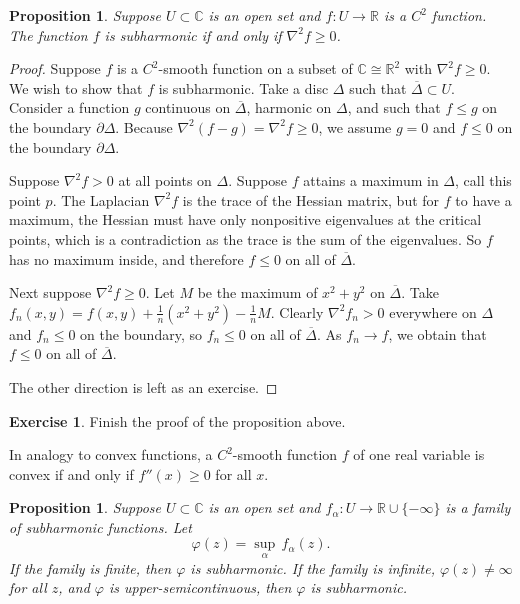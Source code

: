 \documentclass[12pt,openany]{book}
\newcommand{\C}{{\mathbb{C}}}
\newcommand{\R}{{\mathbb{R}}}
\theoremstyle{plain}
\newtheorem{prop}[thm]{Proposition}
\theoremstyle{remark}
\theoremstyle{definition}
\newenvironment{exbox}{%
    \def\FrameCommand{\vrule width 1pt \relax\hspace{10pt}}%
    \MakeFramed {\advance \hsize -\width \FrameRestore}%
}{%
    \endMakeFramed
}
\theoremstyle{exercise}
\newtheorem{exercise}{Exercise}[section]
\theoremstyle{example}
\begin{document}
\begin{prop}
Suppose $U \subset \C$ is an open set and $f \colon U \to \R$ is a $C^2$ function.
The function $f$ is subharmonic if and only if
$\nabla^2 f \geq 0$.
\end{prop}

\begin{proof}
Suppose $f$ is a $C^2$-smooth function on a subset of $\C \cong \R^2$
with $\nabla^2 f \geq 0$.  We wish to show that $f$ is subharmonic.
Take a disc $\Delta$ such that $\overline{\Delta} \subset U$.
Consider a function
$g$ continuous on $\overline{\Delta}$,
harmonic on $\Delta$, and such that
$f \leq g$ on the boundary $\partial \Delta$.  Because
$\nabla^2 (f-g) = \nabla^2 f \geq 0$, we assume $g = 0$ and $f \leq 0$
on the boundary $\partial \Delta$. 

Suppose $\nabla^2 f > 0$ at all points on $\Delta$.
Suppose $f$ attains a maximum in $\Delta$,
call this point $p$.  
The Laplacian $\nabla^2 f$ is the trace of the Hessian matrix, but for $f$ to have a
maximum, the Hessian must have only nonpositive eigenvalues at the critical
points, which is a
contradiction as the trace is the sum of the eigenvalues.  So $f$ has no
maximum inside, and therefore $f \leq 0$ on all of
$\overline{\Delta}$.

Next suppose $\nabla^2 f \geq 0$.
Let $M$ be the maximum of $x^2+y^2$ on $\overline{\Delta}$.
Take $f_n(x,y) = f(x,y) + \frac{1}{n}
( x^2+y^2 ) - \frac{1}{n}M$.  Clearly $\nabla^2 f_n > 0$ everywhere on
$\Delta$ and
$f_n \leq 0$ on the boundary, so $f_n \leq 0$ 
on all of $\overline{\Delta}$.  As $f_n \to f$, we obtain that
$f \leq 0$ on all of $\overline{\Delta}$.

The other direction is left as an exercise.
\end{proof}

\begin{exbox}
\begin{exercise}
Finish the proof of the proposition above.
\end{exercise}
\end{exbox}

In analogy to convex functions, a $C^2$-smooth function $f$ of one
real variable is convex if and only if $f''(x) \geq 0$ for all $x$.

\begin{prop}
\pagebreak[2]
Suppose $U \subset \C$ is an open set and $f_\alpha \colon U \to \R \cup \{ -\infty \}$
is a family of subharmonic functions.  Let
\begin{equation*}
\varphi(z) = \sup_\alpha\, f_\alpha(z) .
\end{equation*}
If the family is finite, then $\varphi$ is subharmonic.
If the family is infinite, $\varphi(z) \not= \infty$ for
all $z$, and $\varphi$
is upper-semicontinuous, then $\varphi$ is subharmonic.
\end{prop}
\end{document}
